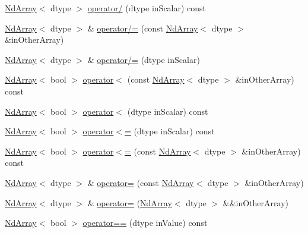 \begin{DoxyCompactItemize}
\item 
\mbox{\hyperlink{class_num_cpp_1_1_nd_array}{Nd\+Array}}$<$ dtype $>$ \mbox{\hyperlink{class_num_cpp_1_1_nd_array_a1e311017d6068b62551da78bdc78ac34}{operator/}} (dtype in\+Scalar) const
\item 
\mbox{\hyperlink{class_num_cpp_1_1_nd_array}{Nd\+Array}}$<$ dtype $>$ \& \mbox{\hyperlink{class_num_cpp_1_1_nd_array_adf0d1f8d1b8f1c1a77551e2d5d864061}{operator/=}} (const \mbox{\hyperlink{class_num_cpp_1_1_nd_array}{Nd\+Array}}$<$ dtype $>$ \&in\+Other\+Array)
\item 
\mbox{\hyperlink{class_num_cpp_1_1_nd_array}{Nd\+Array}}$<$ dtype $>$ \& \mbox{\hyperlink{class_num_cpp_1_1_nd_array_a69ead52a985c3ad7bc61a731c8d8337a}{operator/=}} (dtype in\+Scalar)
\item 
\mbox{\hyperlink{class_num_cpp_1_1_nd_array}{Nd\+Array}}$<$ bool $>$ \mbox{\hyperlink{class_num_cpp_1_1_nd_array_aacb96cf29278cced020132cd8e516a59}{operator$<$}} (const \mbox{\hyperlink{class_num_cpp_1_1_nd_array}{Nd\+Array}}$<$ dtype $>$ \&in\+Other\+Array) const
\item 
\mbox{\hyperlink{class_num_cpp_1_1_nd_array}{Nd\+Array}}$<$ bool $>$ \mbox{\hyperlink{class_num_cpp_1_1_nd_array_a9b33a88659604b840cab4daa6d467b4b}{operator$<$}} (dtype in\+Scalar) const
\item 
\mbox{\hyperlink{class_num_cpp_1_1_nd_array}{Nd\+Array}}$<$ bool $>$ \mbox{\hyperlink{class_num_cpp_1_1_nd_array_ada62322c47c41725df9666743974b8c1}{operator$<$=}} (dtype in\+Scalar) const
\item 
\mbox{\hyperlink{class_num_cpp_1_1_nd_array}{Nd\+Array}}$<$ bool $>$ \mbox{\hyperlink{class_num_cpp_1_1_nd_array_a998f124d73c79190751d812d9c2ae25e}{operator$<$=}} (const \mbox{\hyperlink{class_num_cpp_1_1_nd_array}{Nd\+Array}}$<$ dtype $>$ \&in\+Other\+Array) const
\item 
\mbox{\hyperlink{class_num_cpp_1_1_nd_array}{Nd\+Array}}$<$ dtype $>$ \& \mbox{\hyperlink{class_num_cpp_1_1_nd_array_adcf810c54dabbd02f57690dd1df6c266}{operator=}} (const \mbox{\hyperlink{class_num_cpp_1_1_nd_array}{Nd\+Array}}$<$ dtype $>$ \&in\+Other\+Array)
\item 
\mbox{\hyperlink{class_num_cpp_1_1_nd_array}{Nd\+Array}}$<$ dtype $>$ \& \mbox{\hyperlink{class_num_cpp_1_1_nd_array_a729a494e63df95209e09daa0736165a2}{operator=}} (\mbox{\hyperlink{class_num_cpp_1_1_nd_array}{Nd\+Array}}$<$ dtype $>$ \&\&in\+Other\+Array)
\item 
\mbox{\hyperlink{class_num_cpp_1_1_nd_array}{Nd\+Array}}$<$ bool $>$ \mbox{\hyperlink{class_num_cpp_1_1_nd_array_ac14230e3c4a47152025ff97e9d78cc78}{operator==}} (dtype in\+Value) const

\end{DoxyCompactItemize}
